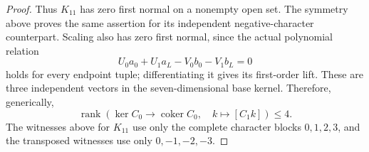 \begin{proof}
Thus $K_{11}$ has zero first normal on a nonempty open set.
The symmetry above proves the same assertion for its independent
negative-character counterpart. Scaling also has zero first
normal, since the actual polynomial relation
\begin{equation}\label{R27:scaling_actual}
 U_0a_0+U_1a_L-V_0b_0-V_1b_L=0
\end{equation}
holds for every endpoint tuple; differentiating it gives its
first-order lift. These are three independent vectors in the
seven-dimensional base kernel. Therefore, generically,
\begin{equation}\label{R27:first_upper}
 \operatorname{rank}\left(\ker C_0\longrightarrow
         \operatorname{coker}C_0,\quad k\longmapsto[C_1k]\right)
 \leq4.
\end{equation}
The witnesses above for $K_{11}$ use only the complete character
blocks $0,1,2,3$, and the transposed witnesses use only
$0,-1,-2,-3$.


\end{proof}
